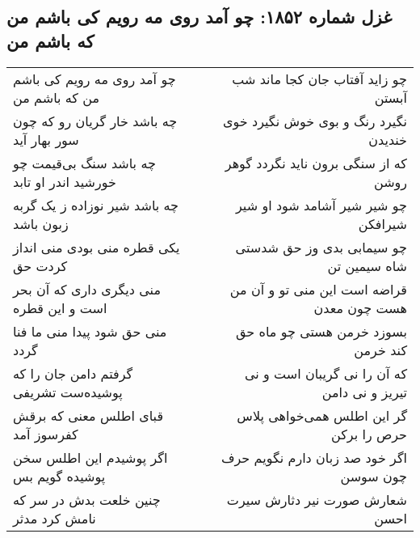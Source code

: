 \begin{center}
\section*{غزل شماره ۱۸۵۲: چو آمد روی مه رویم کی باشم من که باشم من}
\label{sec:1852}
\begin{longtable}{l p{0.5cm} r}
چو آمد روی مه رویم کی باشم من که باشم من
&&
چو زاید آفتاب جان کجا ماند شب آبستن
\\
چه باشد خار گریان رو که چون سور بهار آید
&&
نگیرد رنگ و بوی خوش نگیرد خوی خندیدن
\\
چه باشد سنگ بی‌قیمت چو خورشید اندر او تابد
&&
که از سنگی برون ناید نگردد گوهر روشن
\\
چه باشد شیر نوزاده ز یک گربه زبون باشد
&&
چو شیر شیر آشامد شود او شیر شیرافکن
\\
یکی قطره منی بودی منی انداز کردت حق
&&
چو سیمابی بدی وز حق شدستی شاه سیمین تن
\\
منی دیگری داری که آن بحر است و این قطره
&&
قراضه است این منی تو و آن من هست چون معدن
\\
منی حق شود پیدا منی ما فنا گردد
&&
بسوزد خرمن هستی چو ماه حق کند خرمن
\\
گرفتم دامن جان را که پوشیده‌ست تشریفی
&&
که آن را نی گریبان است و نی تیریز و نی دامن
\\
قبای اطلس معنی که برقش کفرسوز آمد
&&
گر این اطلس همی‌خواهی پلاس حرص را برکن
\\
اگر پوشیدم این اطلس سخن پوشیده گویم بس
&&
اگر خود صد زبان دارم نگویم حرف چون سوسن
\\
چنین خلعت بدش در سر که نامش کرد مدثر
&&
شعارش صورت نیر دثارش سیرت احسن
\\
\end{longtable}
\end{center}
